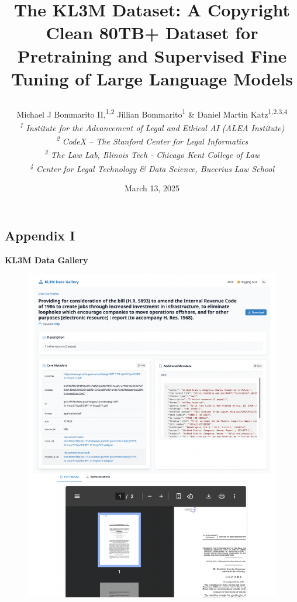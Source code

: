 \documentclass{article}
\title{%

The KL3M Dataset:  A Copyright Clean 80TB+ Dataset for Pretraining and Supervised Fine Tuning of Large Language Models


}
\author{\normalsize{Michael J Bommarito II,\textsuperscript{1,2} Jillian Bommarito}\textsuperscript{1} \& Daniel Martin Katz\textsuperscript{1,2,3,4}\\
  \textit{\small \textsuperscript{1} Institute for the Advancement of Legal and Ethical AI (ALEA Institute)\\
  \textit{\small \textsuperscript{2} CodeX -- The Stanford Center for Legal Informatics}\\
  \textit{\small \textsuperscript{3} The Law Lab, Illinois Tech - Chicago Kent College of Law}\\          
    \textit{\small \textsuperscript{4} Center for Legal Technology \& Data Science, Bucerius Law School}\\  
  }
}
\date{\normalsize{March 13, 2025}}
\begin{document}
\maketitle






%




 

\begin{appendices}

\pagebreak
\setcounter{secnumdepth}{0}
\appendix
\section{Appendix I}
\setcounter{secnumdepth}{0}
\large {\textbf{KL3M Data Gallery}}
\begin{figure}[h!]
\centering
\includegraphics[width=120mm]{KL3MGallery.png}
\caption{}
\label{fig:method}
\end{figure}






\end{appendices}
\end{document}
